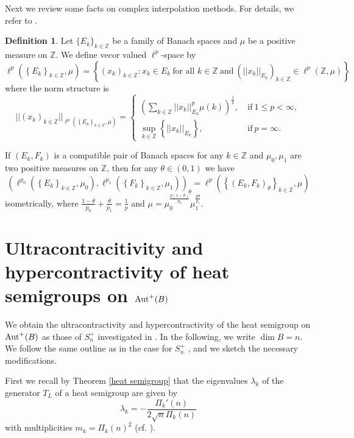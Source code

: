 \documentclass[12pt]{amsart}
\theoremstyle{plain} %
\theoremstyle{definition}
\newtheorem{definition}[equation]{Definition}
\theoremstyle{remark}
\begin{document}
Next we review some facts on complex interpolation methods. For details, we refer to \cite[Section 1]{Xu96}.
\begin{definition}
Let $\{E_k\}_{k\in \mathbb{Z}}$ be a family of Banach spaces and $\mu$ be a positive measure on $\mathbb{Z}$. We define vecor valued $\ell^p$-space by
\[\ell^p(\left \{E_k\right\}_{k\in\mathbb{Z}},\mu)=\left \{(x_k)_{k\in \mathbb{Z}}:x_k\in E_k~\text{for~all~}k\in \mathbb{Z}~\mathrm{and~}\left (||x_k||_{E_k}\right )_{k\in \mathbb{Z}} \in \ell^p(\mathbb{Z}, \mu)\right\}\]
where the norm structure is
\[||(x_k)_{k\in  \mathbb{Z}}||_{\ell^p(\left \{E_k\right\}_{k\in  \mathbb{Z}},\mu)}= \left \{ \begin{array}{cc}\left ( \sum_{k\in  \mathbb{Z}}||x_k||_{E_k}^p \mu(k) \right )^{\frac{1}{p}},&~\mathrm{if~}1\leq p<\infty,\\ \sup_{k\in  \mathbb{Z}}\left \{ ||x_k||_{E_k}\right \},&~\mathrm{if~}p=\infty. \end{array}\right.\]
\end{definition}

If $(E_k,F_k)$ is a compatible pair of Banach spaces for any $k\in \mathbb{Z}$ and $\mu_0,\mu_1$ are two positive measures on $\mathbb{Z}$, then for any $\theta\in (0, 1)$ we have
\[\left (\ell^{p_0}(\left \{E_k\right\}_{k\in \mathbb{Z}},\mu_0),\ell^{p_1}(\left \{F_k\right\}_{k\in \mathbb{Z}},\mu_1) \right )_{\theta}= \ell^{p}(\left \{(E_k,F_k)_{\theta}\right\}_{k\in \mathbb{Z}},\mu)\]
isometrically, where $\displaystyle \frac{1-\theta}{p_0}+\frac{\theta}{p_1}=\frac{1}{p}$ and $\mu=\displaystyle \mu_0^{\frac{p(1-\theta)}{p_0}}\mu_1^{\frac{p \theta}{p_1}}$.

\section{Ultracontracitivity and hypercontractivity of heat semigroups on ${\rm Aut}^+(B)$}
 
We obtain the ultracontractivity and hypercontractivity of the heat semigroup on ${\rm Aut}^+(B)$ as those of $S_n^+$ investigated in \cite{FHLUZ}. In the following, we write $\dim B=n$. We follow the same outline as in the case for $S_n^+$ \cite{FHLUZ}, and we sketch the necessary modifications.

 
First we recall by Theorem \ref{heat semigroup} that the eigenvalues $\lambda_k$ of the generator $T_L$ of a heat semigroup are given by 
\[\lambda_k=-\frac{\Pi_k'(n)}{2\sqrt{n}\Pi_k(n)}\]
with multiplicities $m_k=\Pi_k(n)^2$ \cite[Section 1.4]{FHLUZ} (cf. \cite[Remark 10.4]{CFK}). 
\end{document}
